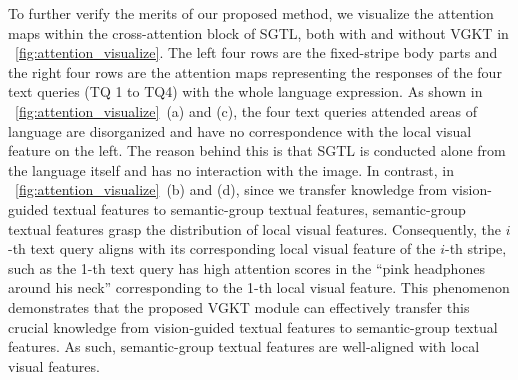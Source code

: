 To further verify the merits of our proposed method, we visualize the attention maps within the cross-attention block of SGTL, both with and without VGKT in  \figurename~\ref{fig:attention_visualize}. The left four rows are the fixed-stripe body parts and the right four rows are the attention maps representing the responses of the four text queries (TQ 1 to TQ4) with the whole language expression. 
As shown in \figurename~\ref{fig:attention_visualize}~(a) and (c), the four text queries attended areas of language are disorganized and have no correspondence with the local visual feature on the left.
The reason behind this is that SGTL is conducted alone from the language itself and has no interaction with the image.
In contrast, in \figurename~\ref{fig:attention_visualize}~(b) and (d), 
since we transfer knowledge from vision-guided textual features to semantic-group textual features, semantic-group textual features grasp the distribution of local visual features. 
Consequently, the $i$-th text query aligns with its corresponding local visual feature of the $i$-th stripe, such as the 1-th text query has high attention scores in the ``pink headphones around his neck'' corresponding to the 1-th local visual feature.  This phenomenon demonstrates that the proposed VGKT module can effectively transfer this crucial knowledge from vision-guided textual features to semantic-group textual features. As such, semantic-group textual features are well-aligned with local visual features.